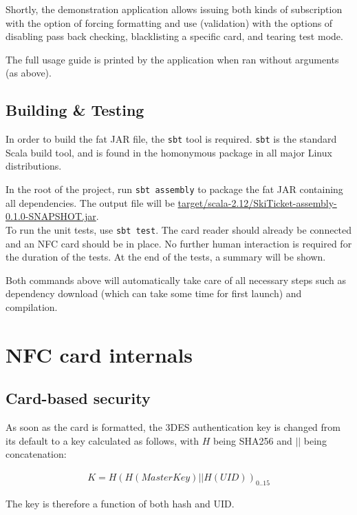 \documentclass[paper=a4, fontsize=11pt]{scrartcl}
\begin{document}
Shortly, the demonstration application allows issuing both kinds of subscription
with the option of forcing formatting and use (validation) with the options of
disabling pass back checking, blacklisting a specific card, and tearing test
mode.

The full usage guide is printed by the application when ran without arguments
(as above).

\subsection{Building \& Testing}

In order to build the fat JAR file, the \texttt{sbt} tool is required.
\texttt{sbt} is the standard Scala build tool, and is found in the homonymous
package in all major Linux distributions.

In the root of the project, run \texttt{sbt assembly} to package the fat JAR
containing all dependencies.
The output file will be
\url{target/scala-2.12/SkiTicket-assembly-0.1.0-SNAPSHOT.jar}.
\\

To run the unit tests, use \texttt{sbt test}.
The card reader should already be connected and an NFC card should be in place.
No further human interaction is required for the duration of the tests.
At the end of the tests, a summary will be shown.

Both commands above will automatically take care of all necessary steps such as
dependency download (which can take some time for first launch) and compilation.

\section{NFC card internals}

\subsection{Card-based security}

As soon as the card is formatted, the 3DES authentication key is changed from
its default to a key calculated as follows, with $H$ being SHA256 and $||$ being
concatenation:

\begin{align*}
    K = H{(H(MasterKey) || H(UID))}_{0..15}
\end{align*}

The key is therefore a function of both hash and UID\@.
\end{document}
